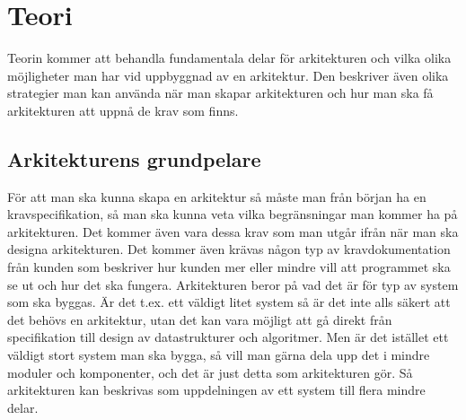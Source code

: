 \section{Teori}
Teorin kommer att behandla fundamentala delar för arkitekturen och vilka olika möjligheter man har vid uppbyggnad av en arkitektur. Den beskriver även olika strategier man kan använda när man skapar arkitekturen och hur man ska få arkitekturen att uppnå de krav som finns.

\subsection{Arkitekturens grundpelare}
För att man ska kunna skapa en arkitektur så måste man från början ha en kravspecifikation, så man ska kunna veta vilka begränsningar man kommer ha på arkitekturen. Det kommer även vara dessa krav som man utgår ifrån när man ska designa arkitekturen.
\newline
\newline
Det kommer även krävas någon typ av kravdokumentation från kunden som beskriver hur kunden mer eller mindre vill att programmet ska se ut och hur det ska fungera.
\newline
\newline
Arkitekturen beror på vad det är för typ av system som ska byggas. Är det t.ex. ett väldigt litet system så är det inte alls säkert att det behövs en arkitektur, utan det kan vara möjligt att gå direkt från specifikation till design av datastrukturer och algoritmer. Men är det istället ett väldigt stort system man ska bygga, så vill man gärna dela upp det i mindre moduler och komponenter, och det är just detta som arkitekturen gör. Så arkitekturen kan beskrivas som uppdelningen av ett system till flera mindre delar.

